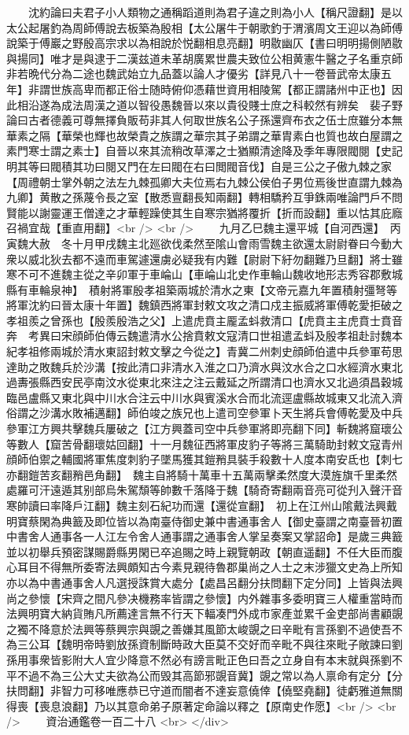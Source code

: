 　　沈約論曰夫君子小人類物之通稱蹈道則為君子違之則為小人【稱尺證翻】是以太公起屠釣為周師傅說去板築為殷相【太公屠牛于朝歌釣于渭濱周文王迎以為師傅說築于傅巖之野殷高宗求以為相說於悦翻相息亮翻】明敭幽仄【書曰明明揚側陋敭與揚同】唯才是與逮于二漢兹道未革胡廣累世農夫致位公相黄憲牛醫之子名重京師非若晩代分為二途也魏武始立九品蓋以論人才優劣【詳見八十一卷晉武帝太康五年】非謂世族高卑而都正俗士随時俯仰憑藉世資用相陵駕【都正謂諸州中正也】因此相沿遂為成法周漢之道以智役愚魏晉以來以貴役賤士庶之科較然有辨矣　裴子野論曰古者德義可尊無擇負販苟非其人何取世族名公子孫還齊布衣之伍士庶雖分本無華素之隔【華榮也輝也故榮貴之族謂之華宗其子弟謂之華胄素白也質也故白屋謂之素門寒士謂之素士】自晉以來其流稍改草澤之士猶顯清途降及季年專限閥閱【史記明其等曰閥積其功曰閱又門在左曰閥在右曰閲閥音伐】自是三公之子傲九棘之家【周禮朝士掌外朝之法左九棘孤卿大夫位焉右九棘公侯伯子男位焉後世直謂九棘為九卿】黄散之孫蔑令長之室【散悉亶翻長知兩翻】轉相驕矜互爭銖兩唯論門戶不問賢能以謝靈運王僧達之才華輕躁使其生自寒宗猶將覆折【折而設翻】重以怙其庇廕召禍宜哉【重直用翻】<br />
<br />
　　九月乙巳魏主還平城【自河西還】　丙寅魏大赦　冬十月甲戌魏主北廵欲伐柔然至隂山會雨雪魏主欲還太尉尉眷曰今動大衆以威北狄去都不遠而車駕遽還虜必疑我有内難【尉尉下紆勿翻難乃旦翻】將士雖寒不可不進魏主從之辛卯軍于車崘山【車崘山北史作車輪山魏收地形志秀容郡敷城縣有車輪泉神】　積射將軍殷孝祖築兩城於清水之東【文帝元嘉九年置積射彊弩等將軍沈約曰晉太康十年置】魏鎮西將軍封敕文攻之清口戍主振威將軍傅乾愛拒破之孝祖羨之曾孫也【殷羨殷浩之父】上遣虎賁主龎孟蚪救清口【虎賁主主虎賁士賁音奔　考異曰宋顔師伯傳云魏遣清水公捨賁敕文寇清口世祖遣孟蚪及殷孝祖赴討魏本紀孝祖修兩城於清水東詔封敕文擊之今從之】青冀二州刺史顔師伯遣中兵參軍苟思達助之敗魏兵於沙溝【按此清口非清水入淮之口乃濟水與汶水合之口水經濟水東北過夀張縣西安民亭南汶水從東北來注之注云戴延之所謂清口也濟水又北過須昌穀城臨邑盧縣又東北與中川水合注云中川水與賓溪水合而北流逕盧縣故城東又北流入濟俗謂之沙溝水敗補邁翻】師伯竣之族兄也上遣司空參軍卜天生將兵會傅乾愛及中兵參軍江方興共擊魏兵屢破之【江方興蓋司空中兵參軍將即亮翻下同】斬魏將窟瓌公等數人【窟苦骨翻瓌姑回翻】十一月魏征西將軍皮豹子等將三萬騎助封敕文寇青州顔師伯禦之輔國將軍焦度刺豹子墜馬獲其鎧矟具裝手殺數十人度本南安氐也【刺七亦翻鎧苦亥翻矟邑角翻】　魏主自將騎十萬車十五萬兩擊柔然度大漠旌旗千里柔然處羅可汗遠遁其别部烏朱駕頹等帥數千落降于魏【騎奇寄翻兩音亮可從刋入聲汗音寒帥讀曰率降戶江翻】魏主刻石紀功而還【還從宣翻】　初上在江州山隂戴法興戴明寶蔡閑為典籖及即位皆以為南臺侍御史兼中書通事舍人【御史臺謂之南臺晉初置中書舍人通事各一人江左令舍人通事謂之通事舍人掌呈奏案又掌詔命】是歲三典籖並以初舉兵預密謀賜爵縣男閑已卒追賜之時上親覽朝政【朝直遥翻】不任大臣而腹心耳目不得無所委寄法興頗知古今素見親待魯郡巢尚之人士之末涉獵文史為上所知亦以為中書通事舍人凡選授誅賞大處分【處昌呂翻分扶問翻下定分同】上皆與法興尚之參懷【宋齊之間凡參决機務率皆謂之參懷】内外雜事多委明寶三人權重當時而法興明寶大納貨賄凡所薦達言無不行天下輻凑門外成市家產並累千金吏部尚書顧覬之獨不降意於法興等蔡興宗與覬之善嫌其風節太峻覬之曰辛毗有言孫劉不過使吾不為三公耳【魏明帝時劉放孫資制斷時政大臣莫不交好而辛毗不與往來毗子敞諫曰劉孫用事衆皆影附大人宜少降意不然必有謗言毗正色曰吾之立身自有本末就與孫劉不平不過不為三公大丈夫欲為公而毁其高節邪覬音冀】覬之常以為人禀命有定分【分扶問翻】非智力可移唯應恭已守道而闇者不達妄意僥倖【僥堅堯翻】徒虧雅道無關得喪【喪息浪翻】乃以其意命弟子原著定命論以釋之【原南史作愿】<br />
<br />
　　資治通鑑卷一百二十八  <br>
   </div> 

